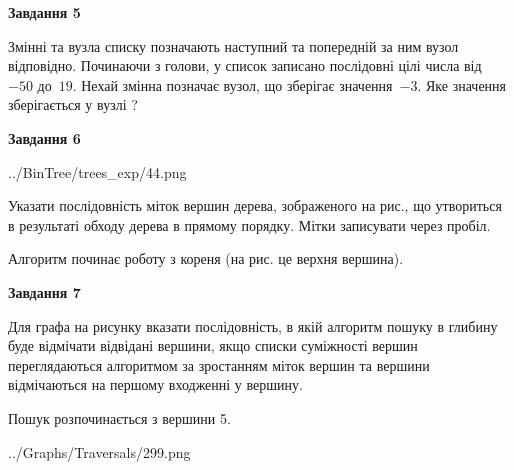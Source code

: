 \documentclass[12pt, ukrainian]{article}
\begin{document}
{\begin {large}
{\begin {center}\textbf{Завдання 5}\end {center}}\par
Змінні  та  вузла списку позначають наступний та попередній за ним вузол відповідно. Починаючи з голови, у список записано послідовні цілі числа від~$-50$ до~$19$. Нехай змінна  позначає вузол, що зберігає значення~$-3$.
Яке значення зберігається у вузлі  ?\par
\newpage

{\begin {center}\textbf{Завдання 6}\end {center}}\par

\begin{center}
	{../BinTree/trees_exp/44.png}
\end{center}
Указати послідовність міток вершин дерева, зображеного на рис., що утвориться в результаті обходу дерева в прямому порядку. Мітки записувати через пробіл.\par Алгоритм починає роботу з кореня (на рис. це верхня вершина).\par
\newpage

{\begin {center}\textbf{Завдання 7}\end {center}}\par
Для графа на рисунку вказати послідовність, в якій алгоритм пошуку в глибину буде відмічати відвідані вершини, якщо списки суміжності вершин переглядаються алгоритмом за зростанням міток вершин та вершини відмічаються на першому вход\-женні у вершину.\par
Пошук розпочинається з вершини 5.\par

\begin{center}
	{../Graphs/Traversals/299.png}
\end{center}\par
\newpage


\end{large}}
\end{document}
